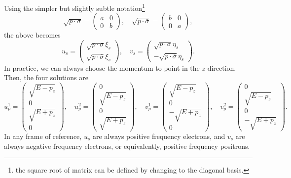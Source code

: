 \documentclass[11pt]{article}
\theoremstyle{definition}
\begin{document}
Using the simpler but slightly subtle notation\footnote{the square root of matrix can be defined by changing to the diagonal basis.}
\begin{equation}
    \sqrt{p\cdot \sigma} = 
    \begin{pmatrix}
        a & 0 \\
        0 & b
    \end{pmatrix}, \quad
    \sqrt{p\cdot \bar{\sigma}} = 
    \begin{pmatrix}
        b & 0 \\
        0 & a 
    \end{pmatrix},
\end{equation}
the above becomes
\begin{equation}
    u_s =
    \begin{pmatrix}
        \sqrt{p\cdot \sigma}\xi_s \\
        \sqrt{p\cdot \bar{\sigma}}\xi_s
    \end{pmatrix}, \quad v_s = 
    \begin{pmatrix}
        \sqrt{p\cdot \sigma}\eta_s \\
        -\sqrt{p\cdot \bar{\sigma}}\eta_s
    \end{pmatrix}.
\end{equation}
In practice, we can always choose the momentum to point in the $z$-direction. Then, the four solutions are
\begin{equation}
u_p^1 = \begin{pmatrix} \sqrt{E - p_z} \\ 0 \\ \sqrt{E + p_z} \\ 0 \end{pmatrix}, \quad 
u_p^2 = \begin{pmatrix} 0 \\ \sqrt{E - p_z} \\ 0 \\ \sqrt{E + p_z} \end{pmatrix}, \quad 
v_p^1 = \begin{pmatrix} \sqrt{E - p_z} \\ 0 \\ -\sqrt{E + p_z} \\ 0 \end{pmatrix}, \quad 
v_p^2 = \begin{pmatrix} 0 \\ \sqrt{E - p_z} \\ 0 \\ -\sqrt{E + p_z} \end{pmatrix}.
\end{equation}
In any frame of reference, $u_s$ are always positive frequency electrons, and $v_s$ are always negative frequency electrons, or equivalently, positive frequency positrons.
\end{document}
